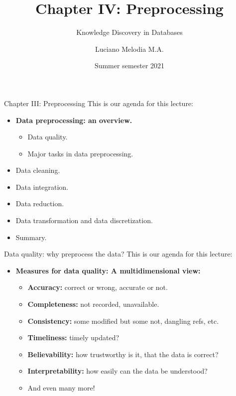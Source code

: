 \documentclass[aspectratio=169,t]{beamer}
\title[KDD]{Chapter IV: Preprocessing}
\subtitle{Knowledge Discovery in Databases}
\author[L.~Melodia]{Luciano Melodia M.A.}
\institute[Department]{Evolutionary Data Management, Friedrich-Alexander University Erlangen-Nürnberg}
\date{Summer semester 2021}
\begin{document}
  \maketitle

  { 
    \begin{frame}{Chapter III: Preprocessing}
    This is our agenda for this lecture:
        \begin{itemize}
            \item \textbf{Data preprocessing: an overview.}
            \begin{itemize}
              \item Data quality.
              \item Major tasks in data preprocessing.
            \end{itemize}
            \item Data cleaning.
            \item Data integration.
            \item Data reduction.
            \item Data transformation and data discretization.
            \item Summary.
        \end{itemize}
    \end{frame}
  }

  { 
    \begin{frame}{Data quality: why preprocess the data?}
    This is our agenda for this lecture:
        \begin{itemize}
            \item \textbf{Measures for {\color{airforceblue}data quality}: A multidimensional view:}
            \begin{itemize}
              \item \textbf{Accuracy:} correct or wrong, accurate or not.
              \item \textbf{Completeness:} not recorded, unavailable.
              \item \textbf{Consistency:} some modified but some not, dangling refs, etc.
              \item \textbf{Timeliness:} timely updated?
              \item \textbf{Believability:} how trustworthy is it, that the data is correct?
              \item \textbf{Interpretability:} how easily can the data be understood?
              \item And even many more!
            \end{itemize}
        \end{itemize}
    \end{frame}
  }
\end{document}
